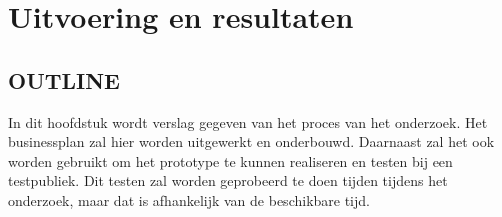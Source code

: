 \section{Uitvoering en resultaten}

\subsection*{OUTLINE}
In dit hoofdstuk wordt verslag gegeven van het proces van het onderzoek. Het businessplan zal hier worden uitgewerkt en onderbouwd. Daarnaast zal het ook worden gebruikt om het prototype te kunnen realiseren en testen bij een testpubliek. Dit testen zal worden geprobeerd te doen tijden tijdens het onderzoek, maar dat is afhankelijk van de beschikbare tijd.
